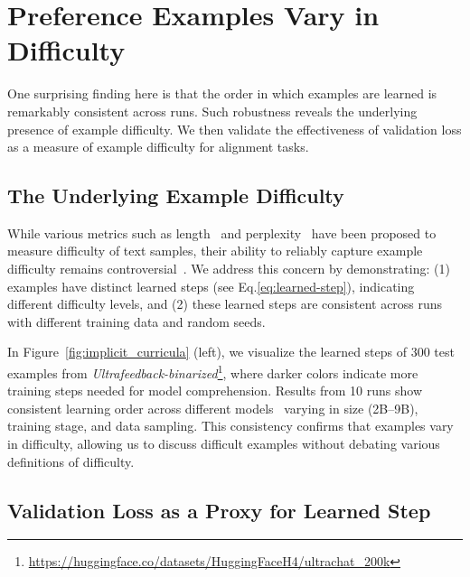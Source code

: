 \section{Preference Examples Vary in Difficulty}
\label{sec:curricula}

One surprising finding here is that the order in which examples are learned is remarkably consistent across runs. Such robustness reveals the underlying presence of example difficulty. We then validate the effectiveness of validation loss as a measure of example difficulty for alignment tasks.

\subsection{The Underlying Example Difficulty}\label{sec:consistent_learning_order}

While various metrics such as length~\cite{spitkovsky2010baby,tay2019simple,nagatsuka2023length} and perplexity~\cite{wu2024curriculum} have been proposed to measure difficulty of text samples,
their ability to reliably capture example difficulty remains controversial~\cite{campos2021curriculum}. 
We address this concern by demonstrating: (1) examples have distinct learned steps (see Eq.\ref{eq:learned-step}), indicating different difficulty levels, and (2) these learned steps are consistent across runs with different training data and random seeds.

In Figure~\ref{fig:implicit_curricula} (left), we visualize the learned steps of 300 test examples from \textit{Ultrafeedback-binarized}\footnote{\url{https://huggingface.co/datasets/HuggingFaceH4/ultrachat\_200k}},%
where darker colors indicate more training steps needed for model comprehension. 
Results from 10 runs show consistent learning order across different models~\citep{jiang2023mistral,llama3modelcard,team2024gemma} varying in size (2B--9B), training stage, and data sampling. This consistency confirms that examples vary in difficulty, allowing us to discuss difficult examples without debating various definitions of difficulty.



\subsection{Validation Loss as a Proxy for Learned Step}


